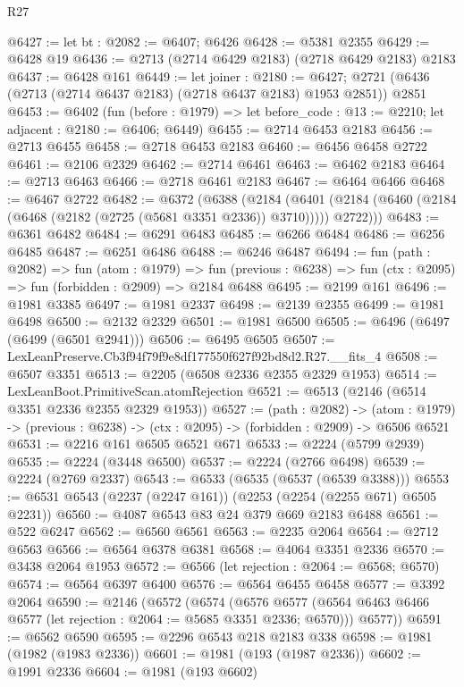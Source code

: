 \begin{lexlean}{R27}
\begin{coremodule}
@6427 := let bt : @2082 := @6407; @6426
@6428 := @5381 @2355
@6429 := @6428 @19
@6436 := @2713 (@2714 @6429 @2183) (@2718 @6429 @2183) @2183
@6437 := @6428 @161
@6449 := let joiner : @2180 := @6427;
  @2721 (@6436 (@2713 (@2714 @6437 @2183) (@2718 @6437 @2183) @1953 @2851)) @2851
@6453 := @6402
    (fun (before : @1979) => let before_code : @13 := @2210; let adjacent : @2180 := @6406; @6449)
@6455 := @2714 @6453 @2183
@6456 := @2713 @6455
@6458 := @2718 @6453 @2183
@6460 := @6456 @6458 @2722
@6461 := @2106 @2329
@6462 := @2714 @6461
@6463 := @6462 @2183
@6464 := @2713 @6463
@6466 := @2718 @6461 @2183
@6467 := @6464 @6466
@6468 := @6467 @2722
@6482 := @6372
    (@6388
      (@2184
        (@6401 (@2184 (@6460 (@2184 (@6468 (@2182 (@2725 (@5681 @3351 @2336)) @3710))))) @2722)))
@6483 := @6361 @6482
@6484 := @6291 @6483
@6485 := @6266 @6484
@6486 := @6256 @6485
@6487 := @6251 @6486
@6488 := @6246 @6487
@6494 := fun (path : @2082) =>
  fun (atom : @1979) =>
  fun (previous : @6238) => fun (ctx : @2095) => fun (forbidden : @2909) => @2184 @6488
@6495 := @2199 @161
@6496 := @1981 @3385
@6497 := @1981 @2337
@6498 := @2139 @2355
@6499 := @1981 @6498
@6500 := @2132 @2329
@6501 := @1981 @6500
@6505 := @6496 (@6497 (@6499 (@6501 @2941)))
@6506 := @6495 @6505
@6507 := LexLeanPreserve.Cb3f94f79f9e8df177550f627f92bd8d2.R27.__fits_4
@6508 := @6507 @3351
@6513 := @2205 (@6508 @2336 @2355 @2329 @1953)
@6514 := LexLeanBoot.PrimitiveScan.atomRejection
@6521 := @6513 (@2146 (@6514 @3351 @2336 @2355 @2329 @1953))
@6527 := (path : @2082) ->
  (atom : @1979) -> (previous : @6238) -> (ctx : @2095) -> (forbidden : @2909) -> @6506 @6521
@6531 := @2216 @161 @6505 @6521 @671
@6533 := @2224 (@5799 @2939)
@6535 := @2224 (@3448 @6500)
@6537 := @2224 (@2766 @6498)
@6539 := @2224 (@2769 @2337)
@6543 := @6533 (@6535 (@6537 (@6539 @3388)))
@6553 := @6531 @6543 (@2237 (@2247 @161)) (@2253 (@2254 (@2255 @671) @6505 @2231))
@6560 := @4087 @6543 @83 @24 @379 @669 @2183 @6488
@6561 := @522 @6247
@6562 := @6560 @6561
@6563 := @2235 @2064
@6564 := @2712 @6563
@6566 := @6564 @6378 @6381
@6568 := @4064 @3351 @2336
@6570 := @3438 @2064 @1953
@6572 := @6566 (let rejection : @2064 := @6568; @6570)
@6574 := @6564 @6397 @6400
@6576 := @6564 @6455 @6458
@6577 := @3392 @2064
@6590 := @2146
    (@6572
      (@6574
        (@6576 @6577 (@6564 @6463 @6466 @6577 (let rejection : @2064 := @5685 @3351 @2336; @6570)))
        @6577))
@6591 := @6562 @6590
@6595 := @2296 @6543 @218 @2183 @338
@6598 := @1981 (@1982 (@1983 @2336))
@6601 := @1981 (@193 (@1987 @2336))
@6602 := @1991 @2336
@6604 := @1981 (@193 @6602)

\end{coremodule}
\end{lexlean}
